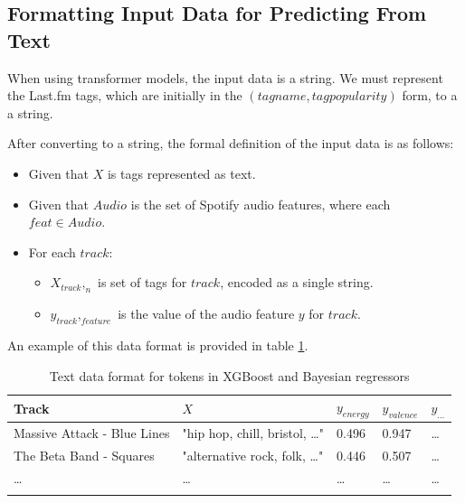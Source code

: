 \documentclass[sn-mathphys]{sn-jnl}%
\theoremstyle{thmstyleone}%
\theoremstyle{thmstyletwo}%
\theoremstyle{thmstylethree}%
\begin{document}
\subsection{Formatting Input Data for Predicting From Text}

When using transformer models, the input data is a string.
We must represent the Last.fm tags, which are initially in the $(tag name, tag popularity)$ form, to a a string.

After converting to a string, the formal definition of the input data is as follows:

\begin{itemize}
      \item Given that $X$ is tags represented as text.
      \item Given that $Audio$ is the set of Spotify audio features, where each $feat \in Audio$.
      \item For each $track$:
      \begin{itemize}
            \item $X_{track},_{n}$ is set of tags for $track$, encoded as a single string.
            \item $y_{track},_{feature}$ is the value of the audio feature $y$ for $track$.
      \end{itemize}
\end{itemize}

An example of this data format is provided in table \ref{text_format}.

\begin{table}[h]
      \begin{center}
      \begin{minipage}{\textwidth}
      \caption{Text data format for tokens in XGBoost and Bayesian regressors}\label{text_format}%
      \begin{tabular}{@{}lllll@{}}
      \toprule
      Track                         & $X$                                   & $y_{energy}$ & $y_{valence}$ & $y_{\dots}$ \\
      \midrule
      Massive Attack - Blue Lines   & "hip hop, chill, bristol, \dots"      & 0.496        & 0.947         & \dots  \\
      The Beta Band - Squares       & "alternative rock, folk, \dots"       & 0.446        & 0.507         & \dots \\
      \dots                         & \dots                                 & \dots        & \dots         & \dots  \\
      \botrule
      \end{tabular}
      \end{minipage}
      \end{center}
\end{table}
\end{document}
